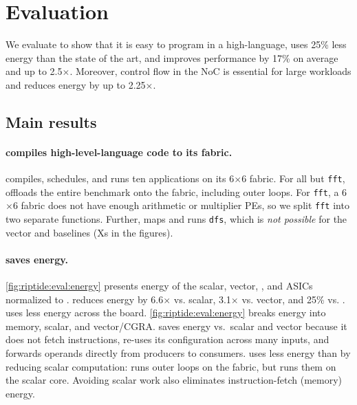 \section{Evaluation}
\label{riptide:eval}

\figRipTidePrimaryArchResults

We evaluate \riptide to show that it is easy to program in a high-language,
uses 25\% less energy than the state of the art,
and improves performance by 17\% on average and up to 2.5$\times$.
Moreover, control flow in the NoC is essential for large
workloads and reduces energy by up to 2.25$\times$.

\subsection{Main results}

\paragraph{\riptide compiles high-level-language code to its fabric.} \riptide
compiles, schedules, and runs ten applications on its 6$\times$6 fabric.
% 
For all but {\tt fft}, \riptide offloads the entire benchmark onto the fabric, including
outer loops.
% 
For {\tt fft}, a 6$\times$6 fabric does not have enough arithmetic or multiplier PEs,
so we split {\tt fft} into two separate functions. 
% 
Further, \riptide maps and runs {\tt dfs}, which is {\em not possible} for
the vector and \snafu baselines (Xs in the figures).

\paragraph{\riptide saves energy.}
\autoref{fig:riptide:eval:energy} presents energy of the scalar, vector, 
\snafu, and ASICs normalized to \riptide.
% 
\riptide reduces energy by 6.6$\times$ vs. scalar, 3.1$\times$ vs. vector, and 25\% vs. \snafu.
%
\riptide uses less energy across the board.
% 
\autoref{fig:riptide:eval:energy} breaks energy into memory, scalar, and vector/CGRA.
% 
\riptide saves energy vs.\ scalar and vector because it does not fetch instructions,
re-uses its configuration across many inputs, and forwards operands 
directly from producers to consumers.
% 
\riptide uses less energy than \snafu by reducing scalar computation:  \riptide runs
outer loops on the fabric, but \snafu runs them on the scalar core.
% 
Avoiding scalar work also eliminates instruction-fetch (memory) energy. 

